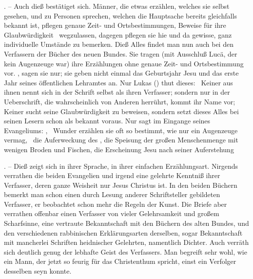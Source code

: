 \begin{aufza}
\item {}. -- Auch dieß bestätiget sich. Männer, die etwas erzählen, welches sie selbst gesehen, und zu Personen sprechen, welchen die Hauptsache bereits gleichfalls bekannt ist, pflegen genaue Zeit- und Ortsbestimmungen, Beweise für ihre Glaubwürdigkeit \udgl\  wegzulassen, dagegen pflegen sie hie und da gewisse, ganz individuelle Umstände zu bemerken. Dieß Alles findet man nun auch bei den Verfassern der Bücher des neuen Bundes. Sie tragen (mit Ausschluß Lucä, der kein Augenzeuge war) ihre Erzählungen ohne genaue Zeit- und Ortsbestimmung vor. , sagen sie nur; sie geben nicht einmal das Geburtsjahr Jesu und das erste Jahr seines öffentlichen Lehramtes an. Nur Lukas () thut dieses:  \usw\ Keiner aus ihnen nennt sich in der Schrift selbst als ihren Verfasser; sondern nur in der Ueberschrift, die wahrscheinlich von Anderen herrührt, kommt ihr Name vor; Keiner sucht seine Glaubwürdigkeit zu beweisen, sondern setzt dieses Alles bei seinen Lesern schon als bekannt voraus. Nur  sagt im Eingange seines Evangeliums: , \usw\ Wunder erzählen sie oft so bestimmt, wie nur ein Augenzeuge vermag, \zB\ die Auferweckung des , die Speisung der großen Menschenmenge mit wenigen Broden und Fischen, die Erscheinung Jesu nach seiner Auferstehung \udgl\ 
\item {}. -- Dieß zeigt sich in ihrer Sprache, in ihrer einfachen Erzählungsart. Nirgends verrathen die beiden Evangelien  und  irgend eine gelehrte Kenntniß ihrer Verfasser, deren ganze Weisheit nur Jesus Christus ist. In den beiden Büchern  bemerkt man schon einen durch Lesung anderer Schriftsteller gebildeten Verfasser, er beobachtet schon mehr die Regeln der Kunst. Die Briefe  aber verrathen offenbar einen Verfasser von vieler Gelehrsamkeit und großem Scharfsinne, eine vertraute Bekanntschaft mit den Büchern des alten Bundes, und den verschiedenen rabbinischen Erklärungsarten derselben, sogar Bekanntschaft mit mancherlei Schriften heidnischer Gelehrten, namentlich Dichter. Auch verräth sich deutlich genug der lebhafte Geist des Verfassers. Man begreift sehr wohl, wie ein Mann, der jetzt so feurig für das Christenthum spricht, einst ein Verfolger desselben seyn konnte.~
\end{aufza}

